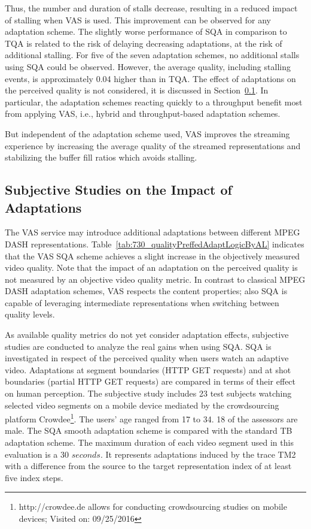 Thus, the number and duration of stalls decrease, resulting in a reduced impact of stalling when \ac{VAS} is used. This improvement can be observed for any adaptation scheme.
The slightly worse performance of \ac{SQA} in comparison to \ac{TQA} is related to the risk of delaying decreasing adaptations, at the risk of additional stalling. 
For five of the seven adaptation schemes, no additional stalls using \ac{SQA} could be observed.
However, the average quality, including stalling events, is approximately 0.04 higher than in \ac{TQA}.
The effect of adaptations on the perceived quality is not considered, it is discussed in Section~\ref{sec:730_eval_quality}.
In particular, the adaptation schemes reacting quickly to a throughput benefit most from applying \ac{VAS}, i.e., hybrid and throughput-based adaptation schemes.

But independent of the adaptation scheme used, \ac{VAS} improves the streaming experience by increasing the average quality of the streamed representations and stabilizing the buffer fill ratios which avoids \ac{stalling}. 
\subsection{Subjective Studies on the Impact of Adaptations}
\label{sec:730_eval_quality}
The \ac{VAS} service may introduce additional adaptations between different \ac{MPEG} \ac{DASH} representations.
Table~\ref{tab:730_qualityPreffedAdaptLogicByAL} indicates that the \ac{VAS} \ac{SQA} scheme achieves a slight increase in the objectively measured video quality. 
Note that the impact of an adaptation on the perceived quality is not measured by an objective video quality metric.
In contrast to classical \ac{MPEG} \ac{DASH} adaptation schemes, \ac{VAS} respects the content properties; also \ac{SQA} is capable of leveraging intermediate representations when switching between quality levels.

As available quality metrics do not yet consider adaptation effects, subjective studies are conducted to analyze the real gains when using \ac{SQA}.
\ac{SQA} is investigated in respect of the perceived quality when users watch an adaptive video.
Adaptations at segment boundaries (\ac{HTTP} GET requests) and at shot boundaries (partial \ac{HTTP} GET requests) are compared in terms of their effect on human perception.
The subjective study includes 23 test subjects watching selected video segments on a mobile device mediated by the crowdsourcing platform Crowdee\footnote{http://crowdee.de allows for conducting crowdsourcing studies on mobile devices; Visited on: 09/25/2016}.
The users' age ranged from 17 to 34. 18 of the assessors are male.
The \ac{SQA} smooth adaptation scheme is compared with the standard \ac{TB} adaptation scheme. 
The maximum duration of each video segment used in this evaluation is a 30 $\unit{seconds}$.
It represents adaptations induced by the trace TM2 with a difference from the source to the target representation index of at least five index steps.



